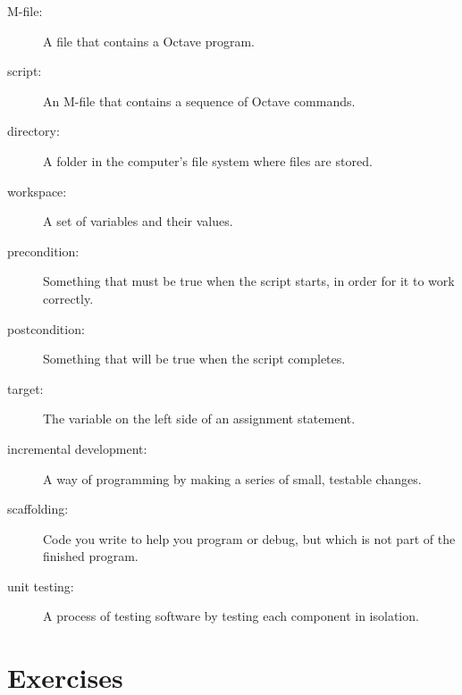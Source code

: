 \documentclass{book}
\begin{document}
\begin{description}

\item[M-file:] A file that contains a Octave program. 

\item[script:] An M-file that contains a sequence of Octave commands.

\item[directory:] A folder in the computer's file system where files are stored.

\item[workspace:] A set of variables and their values. 

\item[precondition:] Something that must be true when the script
starts, in order for it to work correctly.

\item[postcondition:] Something that will be true when the script
completes.

\item[target:] The variable on the left side of an assignment statement. 

\item[incremental development:] A way of programming by making a series
of small, testable changes. 

\item[scaffolding:] Code you write to help you program or debug, but
which is not part of the finished program. 

\item[unit testing:] A process of testing software by testing each
component in isolation.

\end{description}


\section{Exercises}
\end{document}
